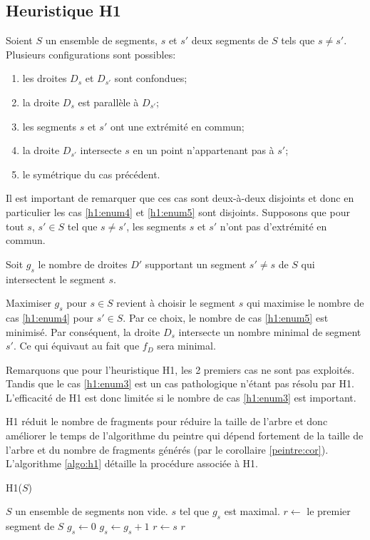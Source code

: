 \subsection{Heuristique H1}
Soient $S$ un ensemble de segments, $s$ et $s'$ deux segments
de $S$ tels que $s \ne s'$.
Plusieurs configurations sont possibles:
\begin{enumerate}
\item les droites  $D_s$ et  $D_{s'}$ sont confondues; \label{h1:enum1}
\item la droite $D_s$ est parallèle à $D_{s'} $; \label{h1:enum2}
\item les segments $s$ et $s'$ ont une extrémité en commun; \label{h1:enum3}
\item la droite $D_{s'}$ intersecte $s$ en un point n'appartenant pas à $s'$;\label{h1:enum4}
\item le symétrique du cas précédent. \label{h1:enum5}
\end{enumerate}

Il est important de remarquer que ces cas sont deux-à-deux disjoints
et donc en particulier les cas \ref{h1:enum4} et \ref{h1:enum5} sont disjoints.
Supposons que pour tout $s$, $s' \in S $ tel que $s \neq s'$,
les segments $s$ et $s'$ n'ont pas d'extrémité en commun.

Soit $g_s$ le nombre de droites $D'$ supportant un segment $s' \neq s$
de $S$ qui intersectent le segment $s$.

Maximiser $g_s$ pour $s \in S$ revient à choisir le segment $s$ qui maximise
le nombre de cas \ref{h1:enum4} pour $s' \in S$.
Par ce choix, le nombre de cas \ref{h1:enum5} est minimisé.
Par conséquent, la droite $D_s$ intersecte un nombre minimal de segment $s'$.
Ce qui équivaut au fait que $f_D$ sera minimal.


Remarquons que pour l'heuristique H1, les 2 premiers cas ne sont pas exploités.
Tandis que le cas \ref{h1:enum3} est un cas pathologique n'étant pas résolu par H1.
L'efficacité de H1 est donc limitée si le nombre de cas
\ref{h1:enum3} est important.

H1 réduit le nombre de fragments pour réduire la taille de l'arbre
et donc améliorer le temps de l'algorithme du peintre qui dépend
fortement de la taille de l'arbre et du nombre de fragments générés (par
le corollaire \ref{peintre:cor}). L'algorithme \ref{algo:h1} détaille
la procédure associée à H1.

\begin{algorithm}
  \caption{H1($S$)}
  \begin{algorithmic}[1] \label{algo:h1}
    \REQUIRE $S$ un ensemble de segments non vide.
    \ENSURE $s$ tel que $g_s$ est maximal.
    \STATE$r\leftarrow$ le premier segment de $S$
    \STATE $g_s\leftarrow 0$
    \ENDFOR
    \STATE $g_s\leftarrow g_s +1$
    \ENDIF
    \ENDFOR
    \STATE $r\leftarrow s$
    \ENDIF
    \ENDFOR
    \RETURN $r$
  \end{algorithmic}
\end{algorithm}

